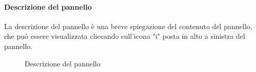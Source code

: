 \paragraph{Descrizione del pannello}
La descrizione del pannello è una breve spiegazione del contenuto del pannello, che può essere visualizzata cliccando sull'icona "i" posta in alto a sinistra del pannello.
\begin{figure}[H]
    \centering
    \caption{Descrizione del pannello}
    \label{fig:my_label}
\end{figure}

